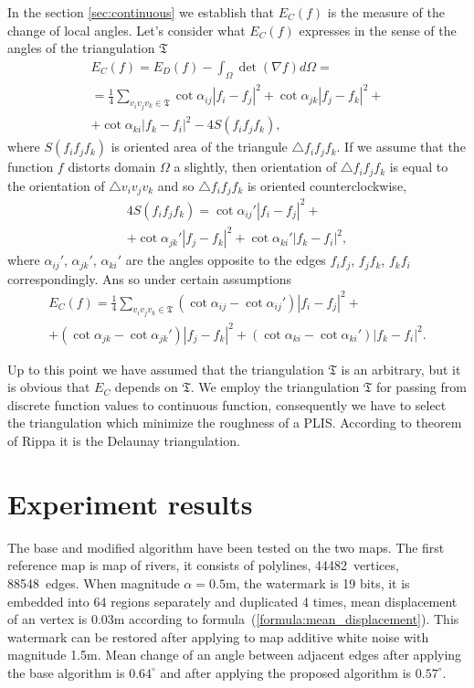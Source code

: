 \documentclass{article}
\begin{document}
In the section \ref{sec:continuous} we establish that $E_C(f)$ is the measure of the change of local angles. Let's consider what $E_C(f)$ expresses in the sense of the angles of the triangulation $\mathfrak{T}$ 
\begin{multline*}
  E_C(f) = E_D(f) - \int_{\Omega} \det (\nabla f) d\Omega = \\ = \frac{1}{4} \sum_{v_i v_j v_k \in \mathfrak{T}} \cot{\alpha_{ij}}|f_i - f_j|^2 + \cot{\alpha_{jk}}|f_j - f_k|^2 + \\
  + \cot{\alpha_{ki}}|f_k - f_i|^2 - 4S(f_i f_j f_k),
\end{multline*}
where $S(f_i f_j f_k)$ is oriented area of the triangule $\triangle f_i f_j f_k$. If we assume that the function $f$ distorts domain $\Omega$ a slightly, then orientation of $\triangle f_i f_j f_k$ is equal to 
the orientation of $\triangle v_i v_j v_k$ and so $\triangle f_i f_j f_k$ is oriented counterclockwise,
\begin{multline*}
  4 S(f_i f_j f_k) = \cot{\alpha_{ij}'}|f_i - f_j|^2 + \\
  + \cot{\alpha_{jk}'}|f_j - f_k|^2 + \cot{\alpha_{ki}'}|f_k - f_i|^2,
\end{multline*}
where $\alpha_{ij}'$, $\alpha_{jk}'$, $\alpha_{ki}'$ are the angles opposite to the edges $f_i f_j$, $f_j f_k$, $f_k f_i$ correspondingly. Ans so under certain assumptions
\begin{multline*}
  E_C(f) = \frac{1}{4} \sum_{v_i v_j v_k \in \mathfrak{T}} (\cot{\alpha_{ij}} - \cot{\alpha_{ij}'})|f_i - f_j|^2 + \\
  + (\cot{\alpha_{jk}} - \cot{\alpha_{jk}'})|f_j - f_k|^2 + (\cot{\alpha_{ki}} - \cot{\alpha_{ki}'})|f_k - f_i|^2.
\end{multline*}

Up to this point we have assumed that the triangulation $\mathfrak{T}$ is an arbitrary, but it is obvious that $E_C$ depends on $\mathfrak{T}$. We employ the triangulation $\mathfrak{T}$ for passing 
from discrete function values to continuous function, consequently we have to select the triangulation which minimize the roughness of a PLIS. According to theorem of Rippa \cite{Rippa, Chen} 
it is the Delaunay triangulation.  

\section{Experiment results}
\label{sec:results}
The base and modified algorithm have been tested on the two maps. The first reference map is map of rivers, it consists of polylines, 44482~vertices, 88548~edges. When magnitude $\alpha = 0.5$m, 
the watermark is 19 bits, it is embedded into 64 regions separately and duplicated 4 times, mean displacement of an vertex is 0.03m according to formula~(\ref{formula:mean_displacement}). This watermark can be restored
after applying to map additive white noise with magnitude 1.5m. Mean change of an angle between adjacent edges after applying the base algorithm is $0.64^\circ$ and after applying the proposed algorithm is $0.57^\circ$.
\end{document}

